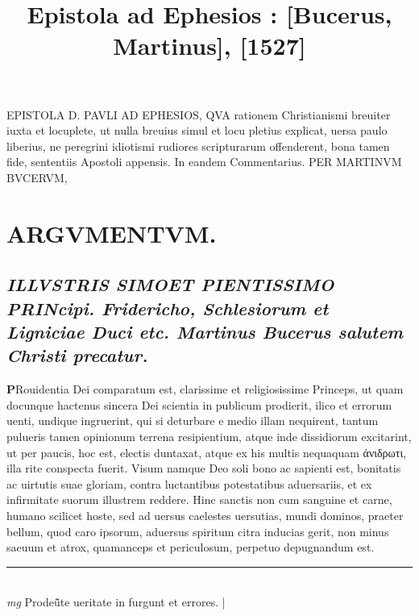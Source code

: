 \documentclass{article}
\begin{document}
\date{}
        \title{ Epistola ad Ephesios : [Bucerus, Martinus], [1527]}
\maketitle
\tableofcontents
\clearpage
\begin{pages} 
\beginnumbering
        EPISTOLA D. PAVLI AD EPHESIOS, QVA rationem Christianismi breuiter iuxta et locuplete, ut nulla breuius simul et locu pletius explicat, uersa paulo liberius, ne peregrini idiotismi rudiores scripturarum offenderent, bona tamen fide, sententiis Apostoli appensis.  In eandem Commentarius.  PER MARTINVM BVCERVM, 
\section*{ARGVMENTVM.  }
{}
\subsection*{\textit{ILLVSTRIS SIMOET PIENTISSIMO PRINcipi.  Fridericho, Schlesiorum et Ligniciae Duci etc. Martinus Bucerus salutem Christi precatur.  }}\pstart \huge\textbf{P}\normalsize Rouidentia Dei comparatum est, clarissime et religiosissime Princeps, ut quam docunque hactenus sincera Dei scientia in publicum prodierit, ilico et errorum uenti, undique ingruerint, qui si deturbare e medio illam nequirent, tantum pulueris tamen opinionum terrena resipientium, atque inde dissidiorum excitarint, ut per paucis, hoc est, electis duntaxat, atque  ex his multis nequaquam ἀνιδρωτι, illa rite conspecta fuerit. Visum namque  Deo soli bono ac sapienti est, bonitatis ac uirtutis suae gloriam, contra luctantibus potestatibus aduersariis, et ex infirmitate suorum illustrem reddere. Hinc sanctis non cum sanguine et carne, humano scilicet hoste, sed ad uersus caelestes uersutias, mundi dominos, praeter bellum, quod caro ipsorum, aduersus spiritum citra inducias gerit, non minus saeuum et atrox, quamanceps et periculosum, perpetuo depugnandum est.   \pend
\vspace{0.5cm}\noindent
\vspace{0.2cm}\rule{1cm}{0.2pt}\\ 
\hspace{0.2cm}\textit{mg}
\footnotesize Prodeü̃te ueritate in furgunt et errores. 
\normalsize| 

\end{pages}
\end{document}
